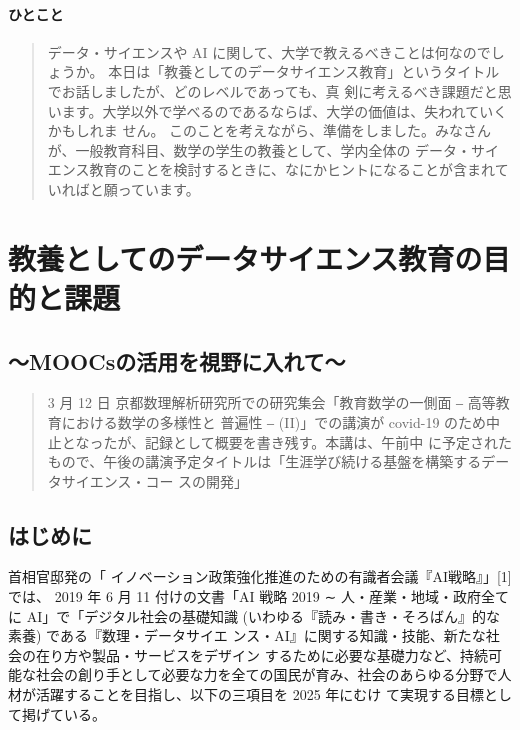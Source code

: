 \documentclass[
]{book}
\theoremstyle{definition}
\theoremstyle{definition}
\theoremstyle{definition}
\theoremstyle{definition}
\theoremstyle{remark}
\begin{document}
\hypertarget{ux3072ux3068ux3053ux3068}{%
\subsubsection{ひとこと}\label{ux3072ux3068ux3053ux3068}}

\begin{quote}
データ・サイエンスや AI に関して、大学で教えるべきことは何なのでしょうか。 本日は「教養としてのデータサイエンス教育」というタイトルでお話しましたが、どのレベルであっても、真
剣に考えるべき課題だと思います。大学以外で学べるのであるならば、大学の価値は、失われていくかもしれま
せん。
このことを考えながら、準備をしました。みなさんが、一般教育科目、数学の学生の教養として、学内全体の データ・サイエンス教育のことを検討するときに、なにかヒントになることが含まれていればと願っています。
\end{quote}

\hypertarget{math2020}{%
\chapter{教養としてのデータサイエンス教育の目的と課題}\label{math2020}}

\hypertarget{moocsux306eux6d3bux7528ux3092ux8996ux91ceux306bux5165ux308cux3066-1}{%
\section*{～MOOCsの活用を視野に入れて～}\label{moocsux306eux6d3bux7528ux3092ux8996ux91ceux306bux5165ux308cux3066-1}}

\begin{quote}
3 月 12 日 京都数理解析研究所での研究集会「教育数学の一側面 ‒ 高等教育における数学の多様性と 普遍性 ‒ (II)」での講演が covid-19 のため中止となったが、記録として概要を書き残す。本講は、午前中 に予定されたもので、午後の講演予定タイトルは「生涯学び続ける基盤を構築するデータサイエンス・コー スの開発」
\end{quote}

\hypertarget{ux306fux3058ux3081ux306b-1}{%
\section{はじめに}\label{ux306fux3058ux3081ux306b-1}}

首相官邸発の「 イノベーション政策強化推進のための有識者会議『AI戦略』」{[}1{]} では、 2019 年 6 月 11 付けの文書「AI 戦略 2019 ∼ 人・産業・地域・政府全てに AI」で「デジタル社会の基礎知識 (いわゆる『読み・書き・そろばん』的な素養) である『数理・データサイエ ンス・AI』に関する知識・技能、新たな社会の在り方や製品・サービスをデザイン するために必要な基礎力など、持続可能な社会の創り手として必要な力を全ての国民が育み、社会のあらゆる分野で人材が活躍することを目指し、以下の三項目を 2025 年にむけ て実現する目標として掲げている。
\end{document}
